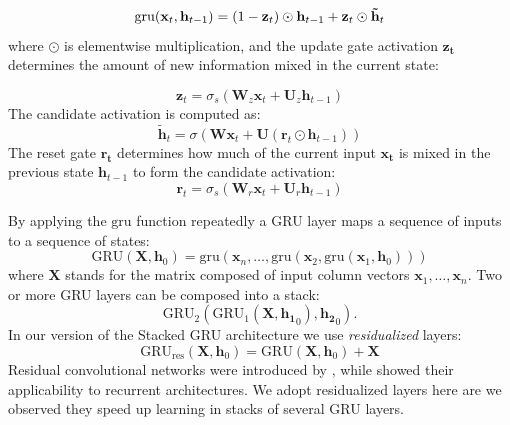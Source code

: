 \begin{equation}
  \mathrm{gru}(\mathbf{x}_t, \mathbf{h}_{t-1}) = (1 - \mathbf{z}_t)\odot \mathbf{h}_{t-1} + \mathbf{z}_t \odot \mathbf{\tilde{h}}_t
\vspace{-.1cm}
\end{equation}
%
where $\odot$ is elementwise multiplication, and the update gate
activation $\mathbf{z_{t}}$ determines the amount of new information
mixed in the current state:
%

\begin{equation}
\label{eq:gru-update}
   \mathbf{z}_t = \sigma_s(\mathbf{W}_z \mathbf{x}_t + \mathbf{U}_z \mathbf{h}_{t-1})
\end{equation}
%
The candidate activation is computed as:
%
\begin{equation}
\label{eq:gru-cand}
   \mathbf{\tilde{h}}_t = \sigma(\mathbf{W} \mathbf{x}_t + \mathbf{U}(\mathbf{r}_t \odot \mathbf{h}_{t-1}))
\end{equation}
%
The reset gate $\mathbf{r_{t}}$ determines how much of the current
input $\mathbf{x_{t}}$ is mixed in the previous state
$\mathbf{h}_{t-1}$ to form the candidate activation:
%
\begin{equation}
\label{eq:gru-reset}
   \mathbf{r}_t = \sigma_s(\mathbf{W}_r \mathbf{x}_t + \mathbf{U}_r \mathbf{h}_{t-1})
\end{equation}

By applying the $\mathrm{gru}$ function repeatedly a GRU layer maps a
sequence of inputs to a sequence of states:
\begin{equation}
  \mathrm{GRU}(\mathbf{X}, \mathbf{h}_0) = \mathrm{gru}(\mathbf{x}_n, \dots, \mathrm{gru}(\mathbf{x}_2, \mathrm{gru}(\mathbf{x}_1, \mathbf{h}_0)))
\end{equation}
where $\mathbf{X}$ stands for the matrix composed of input column vectors
$\mathbf{x}_1, \ldots, \mathbf{x}_n$. Two or more GRU layers can be composed into a stack: 
\begin{equation}
\mathrm{GRU}_2(\mathrm{GRU}_1(\mathbf{X}, {\mathbf{h_1}}_{0}), {\mathbf{h_2}}_{0}).
\end{equation}
In our version of the Stacked GRU architecture we use {\it residualized} layers:
\begin{equation}
\mathrm{GRU_{res}}(\mathbf{X}, \mathbf{h}_0) = \mathrm{GRU}(\mathbf{X}, \mathbf{h}_0) + \mathbf{X}
\end{equation}
Residual convolutional networks were introduced by
, while  showed their
applicability to recurrent architectures. We adopt residualized layers
here are we observed they speed up learning in stacks of several
GRU layers.

